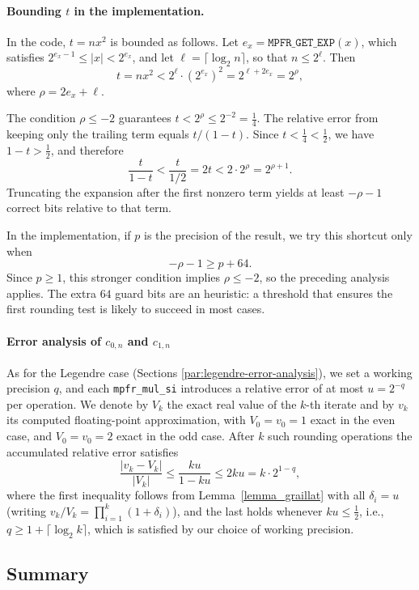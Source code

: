 \documentclass[12pt]{amsart}
\begin{document}
\paragraph{\textbf{Bounding $t$ in the implementation.}}
In the code, $t = nx^2$ is bounded as follows.
Let $e_x = \texttt{MPFR\_GET\_EXP}(x)$, which satisfies
$2^{e_x-1} \le |x| < 2^{e_x}$, and let
$\ell = \lceil \log_2 n \rceil$, so that $n \le 2^\ell$.
Then
\[
  t = nx^2 < 2^\ell \cdot \left(2^{e_x}\right)^2
          = 2^{\ell + 2e_x} = 2^\rho,
\]
where $\rho = 2e_x + \ell$.

The condition $\rho \le -2$ guarantees
$t < 2^\rho \le 2^{-2} = \tfrac{1}{4}$.
The relative error from keeping only the trailing term equals $t/(1-t)$.
Since $t < \tfrac{1}{4} < \tfrac{1}{2}$, we have $1 - t > \tfrac{1}{2}$,
and therefore
\[
  \frac{t}{1-t} < \frac{t}{1/2} = 2t < 2 \cdot 2^\rho = 2^{\rho+1}.
\]
Truncating the expansion after the first nonzero term yields at least
$-\rho - 1$ correct bits relative to that term.

In the implementation, if $p$ is the precision of the result, we try this
shortcut only when
\[
  -\rho - 1 \ge p + 64.
\]
Since $p \ge 1$, this stronger condition implies $\rho \le -2$, so the
preceding analysis applies. The extra $64$ guard bits are an heuristic:
a threshold that ensures the first rounding test is likely to succeed
in most cases.

\paragraph{\textbf{Error analysis of $c_{0,n}$ and $c_{1,n}$}}
As for the Legendre case (Sections \ref{par:legendre-error-analysis}), we set
a working precision $q$, and each \texttt{mpfr\_mul\_si} introduces a relative
error of at most $u = 2^{-q}$ per operation. We denote by $V_k$ the exact real
value of the $k$-th iterate and by $v_k$ its computed floating-point approximation,
with $V_0 = v_0 = 1$ exact in the even case, and $V_0 = v_0 = 2$ exact in the odd
case. After $k$ such rounding
operations the accumulated relative error satisfies
\[
  \frac{|v_k - V_k|}{|V_k|}
  \le \frac{ku}{1-ku}
  \le 2ku = k \cdot 2^{1-q},
\]
where the first inequality follows from Lemma~\ref{lemma_graillat} with all
$\delta_i = u$ (writing $v_k/V_k = \prod_{i=1}^k(1+\delta_i)$), and the last
holds whenever $ku \le \tfrac{1}{2}$, i.e., $q \ge 1 + \lceil\log_2 k\rceil$,
which is satisfied by our choice of working precision.

\subsection{Summary}
\end{document}
